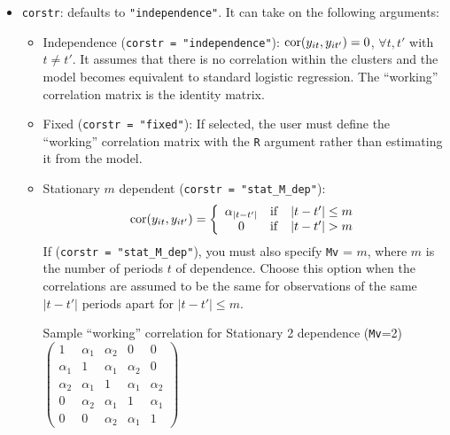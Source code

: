 \begin{itemize}
\item \texttt{corstr}: defaults to {\tt "independence"}.  It can take on the following arguments:
\begin{itemize}
\item Independence (\texttt{corstr = "independence"}): ${\rm
    cor}(y_{it}, y_{it'})=0$, $\forall t, t'$ with $t\ne t'$.  It assumes that there is no correlation within the clusters and the model becomes equivalent to standard logistic regression.  The ``working'' correlation matrix is the identity matrix.
\item Fixed (\texttt{corstr = "fixed"}): If selected, the user must define the ``working'' correlation matrix with the \texttt{R} argument rather than estimating it from the model.
\item Stationary $m$ dependent (\texttt{corstr = "stat\_M\_dep"}):
  $${\rm cor}(y_{it}, y_{it'})=\left\{\begin{array}{ccc}
      \alpha_{|t-t'|} & {\rm if} & |t-t'|\le m \\ 0 & {\rm if}
      & |t-t'| > m
    \end{array}\right.$$
  If (\texttt{corstr = "stat\_M\_dep"}), you must also specify \texttt{Mv} = $m$, where $m$
is the number of periods $t$ of dependence.  Choose this option when the correlations are assumed to be the same for observations of the same $|t-t'|$ periods apart for $|t-t'| \leq m$.
\begin{center}
Sample ``working'' correlation for Stationary 2 dependence ({\tt Mv}=2)\\
\bigskip
$\left( \begin{array}{ccccc}
1 & \alpha_1 & \alpha_2 & 0 & 0 \\
\alpha_1 & 1 & \alpha_1 & \alpha_2 & 0 \\
\alpha_2 & \alpha_1 & 1 & \alpha_1 & \alpha_2 \\
0 & \alpha_2 & \alpha_1 & 1 & \alpha_1 \\
0 & 0 & \alpha_2 & \alpha_1 & 1
\end{array} \right) $
\end{center}


\end{itemize}
\end{itemize}
